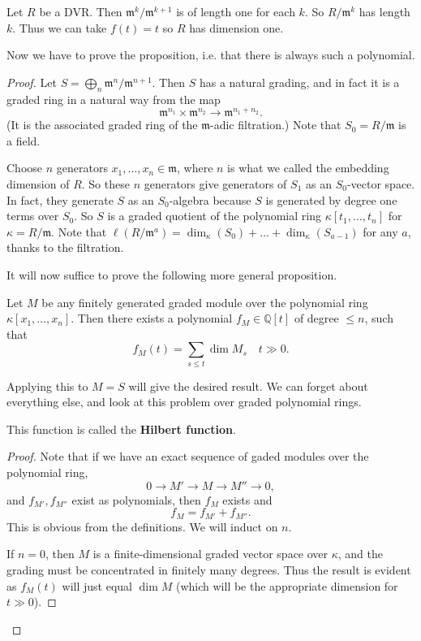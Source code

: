 \begin{example} 
Let $R$ be a DVR. Then $\mathfrak{m}^k/\mathfrak{m}^{k+1}$ is of length one for
each $k$. So $R/\mathfrak{m}^k$ has length $k$. Thus we can take $f(t) = t$ so
$R$ has dimension one.
\end{example} 

Now we have to prove the proposition, i.e. that there is always such a
polynomial.
\begin{proof} 
Let $S = \bigoplus_n  \mathfrak{m}^n/\mathfrak{m}^{n+1}$. Then $S$ has a
natural grading, and in fact it is a graded ring in a natural way from the map 
\[ \mathfrak{m}^{n_1} \times \mathfrak{m}^{n_2} \to \mathfrak{m}^{n_1 + n_2}.  \]
(It is the associated graded ring of the $\mathfrak{m}$-adic filtration.)
Note that $S_0 = R/\mathfrak{m}$ is a field.

Choose $n$ generators $x_1, \dots, x_n \in \mathfrak{m}$, where $n$ is what we
called the embedding dimension of $R$. So these $n$ generators give generators
of $S_1$ as an $S_0$-vector space. In fact, they generate $S$ as an
$S_0$-algebra because $S$ is generated by degree one terms over $S_0$.
So $S$ is a graded quotient of the polynomial ring $\kappa[t_1, \dots, t_n]$
for $\kappa = R/\mathfrak{m}$.
Note that $\ell(R/\mathfrak{m}^a)  = \dim_{\kappa}(S_0) + \dots +
\dim_{\kappa}(S_{a-1})$ for any $a$, thanks to the filtration. 

It will now suffice to prove the following more general proposition.
\begin{proposition} 
Let $M$ be any finitely generated graded module over the polynomial ring $\kappa[x_1, \dots, x_n]$. Then
there exists a polynomial $f_M \in \mathbb{Q}[t]$ of degree $ \leq n$, such that
\[ f_M(t) = \sum_{s \leq t} \dim M_s \quad t \gg 0.   \]
\end{proposition} 
Applying this to $M = S$ will give the desired result. We can forget about
everything else, and look at this problem over graded polynomial rings.

This function is called the \textbf{Hilbert function}.

\begin{proof} 
Note that if we have an exact sequence of gaded modules over the polynomial
ring,
\[ 0 \to M' \to M \to M'' \to 0,   \]
and $f_{M'}, f_{M''}$ exist as polynomials, then $f_M$ exists and 
\[ f_M = f_{M'} + f_{M''}.  \] This is obvious from the definitions. We will
induct on $n$. 

If $n  = 0$, then $M$ is a finite-dimensional graded vector space over
$\kappa$, and the grading must be concentrated in finitely many degrees. Thus
the result is evident as $f_{M}(t)$ will just equal $\dim M$ (which will be the
appropriate dimension for $t \gg 0$). 


\end{proof}
\end{proof}

